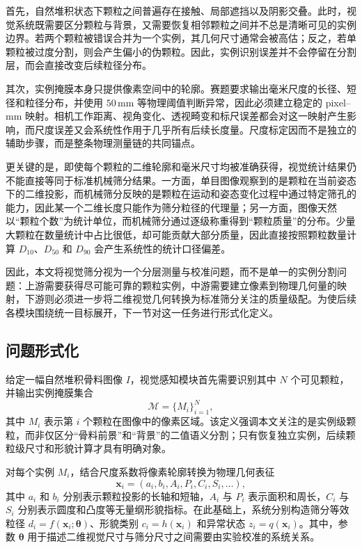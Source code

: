 首先，自然堆积状态下颗粒之间普遍存在接触、局部遮挡以及阴影交叠。此时，视觉系统既需要区分颗粒与背景，又需要恢复相邻颗粒之间并不总是清晰可见的实例边界。若两个颗粒被错误合并为一个实例，其几何尺寸通常会被高估；反之，若单颗粒被过度分割，则会产生偏小的伪颗粒。因此，实例识别误差并不会停留在分割层，而会直接改变后续粒径分布。

其次，实例掩膜本身只提供像素空间中的轮廓。赛题要求输出毫米尺度的长径、短径和粒径分布，并使用 $50\,\mathrm{mm}$ 等物理阈值判断异常，因此必须建立稳定的 pixel--mm 映射。相机工作距离、视角变化、透视畸变和标尺误差都会对这一映射产生影响，而尺度误差又会系统性作用于几乎所有后续长度量。尺度标定因而不是独立的辅助步骤，而是整条物理测量链的共同锚点。

更关键的是，即使每个颗粒的二维轮廓和毫米尺寸均被准确获得，视觉统计结果仍不能直接等同于标准机械筛分结果。一方面，单目图像观察到的是颗粒在当前姿态下的二维投影，而机械筛分反映的是颗粒在运动和姿态变化过程中通过特定筛孔的能力，因此某一个二维长度只能作为筛分粒径的代理量；另一方面，图像天然以“颗粒个数”为统计单位，而机械筛分通过逐级称重得到“颗粒质量”的分布。少量大颗粒在数量统计中占比很低，却可能贡献大部分质量，因此直接按照颗粒数量计算 $D_{10}$、$D_{50}$ 和 $D_{90}$ 会产生系统性的统计口径偏差。

因此，本文将视觉筛分视为一个分层测量与校准问题，而不是单一的实例分割问题：上游需要获得尽可能可靠的颗粒实例，中游需要建立像素到物理几何量的映射，下游则必须进一步将二维视觉几何转换为标准筛分关注的质量级配。为使后续各模块围绕统一目标展开，下一节对这一任务进行形式化定义。

\subsection{问题形式化}
\label{sec:problem-formulation}

给定一幅自然堆积骨料图像 $I$，视觉感知模块首先需要识别其中 $N$ 个可见颗粒，并输出实例掩膜集合
\begin{equation}
\mathcal{M}=\{M_i\}_{i=1}^{N},
\label{eq:instance-set}
\end{equation}
其中 $M_i$ 表示第 $i$ 个颗粒在图像中的像素区域。该定义强调本文关注的是实例级颗粒，而非仅区分“骨料前景”和“背景”的二值语义分割；只有恢复独立实例，后续颗粒级尺寸和形貌计算才具有明确对象。

对每个实例 $M_i$，结合尺度系数将像素轮廓转换为物理几何表征
\begin{equation}
\mathbf{x}_i=(a_i,b_i,A_i,P_i,C_i,S_i,\ldots),
\label{eq:particle-descriptor}
\end{equation}
其中 $a_i$ 和 $b_i$ 分别表示颗粒投影的长轴和短轴，$A_i$ 与 $P_i$ 表示面积和周长，$C_i$ 与 $S_i$ 分别表示圆度和凸度等无量纲形貌指标。在此基础上，系统分别构造筛分等效粒径 $d_i=f(\mathbf{x}_i;\boldsymbol{\theta})$、形貌类别 $c_i=h(\mathbf{x}_i)$ 和异常状态 $z_i=q(\mathbf{x}_i)$。其中，参数 $\boldsymbol{\theta}$ 用于描述二维视觉尺寸与筛分尺寸之间需要由实验校准的系统关系。

